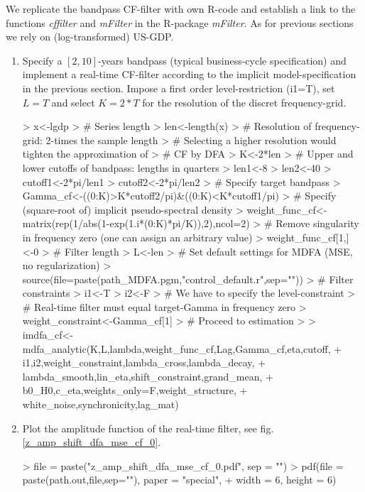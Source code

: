 \documentclass[a4paper]{book}
\begin{document}
We replicate the bandpass CF-filter with own R-code and establish a link to the functions \emph{cffilter} and \emph{mFilter} in the R-package \emph{mFilter}. As for previous sections we rely on (log-transformed) US-GDP.
\begin{enumerate}
\item Specify a $[2,10]$-years bandpass (typical business-cycle specification) and implement a real-time CF-filter according to the implicit model-specification in the previous section. Impose a first order level-restriction (i1=T), set $L=T$ and select $K=2*T$ for the resolution of the discret frequency-grid.
\begin{Schunk}
\begin{Sinput}
> x<-lgdp
> # Series length
> len<-length(x)
> # Resolution of frequency-grid: 2-times the sample length
> #   Selecting a higher resolution would tighten the approximation of 
> #   CF by DFA
> K<-2*len
> # Upper and lower cutoffs of bandpass: lengths in quarters
> len1<-8
> len2<-40
> cutoff1<-2*pi/len1
> cutoff2<-2*pi/len2
> # Specify target bandpass
> Gamma_cf<-((0:K)>K*cutoff2/pi)&((0:K)<K*cutoff1/pi)
> # Specify (square-root of) implicit pseudo-spectral density
> weight_func_cf<-matrix(rep(1/abs(1-exp(1.i*(0:K)*pi/K)),2),ncol=2)
> # Remove singularity in frequency zero (one can assign an arbitrary value)
> weight_func_cf[1,]<-0
> # Filter length
> L<-len
> # Set default settings for MDFA (MSE, no regularization)
> source(file=paste(path_MDFA.pgm,"control_default.r",sep=""))
> # Filter constraints
> i1<-T
> i2<-F
> # We have to specify the level-constraint
> #   Real-time filter must equal target-Gamma in frequency zero
> weight_constraint<-Gamma_cf[1]
> # Proceed to estimation
> 
> imdfa_cf<-mdfa_analytic(K,L,lambda,weight_func_cf,Lag,Gamma_cf,eta,cutoff,
+                         i1,i2,weight_constraint,lambda_cross,lambda_decay,
+                         lambda_smooth,lin_eta,shift_constraint,grand_mean,
+                         b0_H0,c_eta,weights_only=F,weight_structure,
+                         white_noise,synchronicity,lag_mat)
\end{Sinput}
\end{Schunk}
\item Plot the amplitude function of the real-time filter, see fig.\ref{z_amp_shift_dfa_mse_cf_0}.
\begin{Schunk}
\begin{Sinput}
> file = paste("z_amp_shift_dfa_mse_cf_0.pdf", sep = "")
> pdf(file = paste(path.out,file,sep=""), paper = "special", 
+     width = 6, height = 6)

\end{Sinput}
\end{Schunk}
\end{enumerate}
\end{document}

